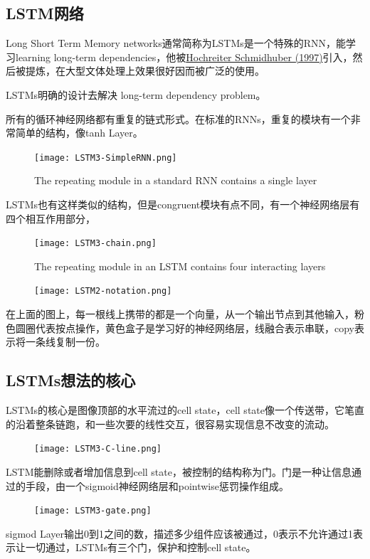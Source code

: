 \subsection{LSTM网络}
Long Short Term Memory networks通常简称为LSTMs是一个特殊的RNN，能学习learning long-term dependencies，他被\href{http://deeplearning.cs.cmu.edu/pdfs/Hochreiter97_lstm.pdf}{Hochreiter  Schmidhuber (1997)}引入，然后被提炼，在大型文体处理上效果很好因而被广泛的使用。\par
LSTMs明确的设计去解决 long-term dependency problem。\par
所有的循环神经网络都有重复的链式形式。在标准的RNNs，重复的模块有一个非常简单的结构，像tanh Layer。
\begin{figure}
\centering
\texttt{[image: LSTM3-SimpleRNN.png]}
\caption{The repeating module in a standard RNN contains a single layer}
\end{figure}
LSTMs也有这样类似的结构，但是congruent模块有点不同，有一个神经网络层有四个相互作用部分，
\begin{figure}
\centering
\texttt{[image: LSTM3-chain.png]}
\caption{The repeating module in an LSTM contains four interacting layers}
\end{figure}
\begin{figure}
\centering
\texttt{[image: LSTM2-notation.png]}
\end{figure}
在上面的图上，每一根线上携带的都是一个向量，从一个输出节点到其他输入，粉色圆圈代表按点操作，黄色盒子是学习好的神经网络层，线融合表示串联，copy表示将一条线复制一份。
\subsection{LSTMs想法的核心}
LSTMs的核心是图像顶部的水平流过的cell state，cell state像一个传送带，它笔直的沿着整条链跑，和一些次要的线性交互，很容易实现信息不改变的流动。
\begin{figure}
\centering
\texttt{[image: LSTM3-C-line.png]}
\end{figure}
LSTM能删除或者增加信息到cell state，被控制的结构称为门。门是一种让信息通过的手段，由一个sigmoid神经网络层和pointwise惩罚操作组成。
\begin{figure}
\centering
\texttt{[image: LSTM3-gate.png]}
\end{figure}
sigmod Layer输出0到1之间的数，描述多少组件应该被通过，0表示不允许通过1表示让一切通过，LSTMs有三个门，保护和控制cell state。
